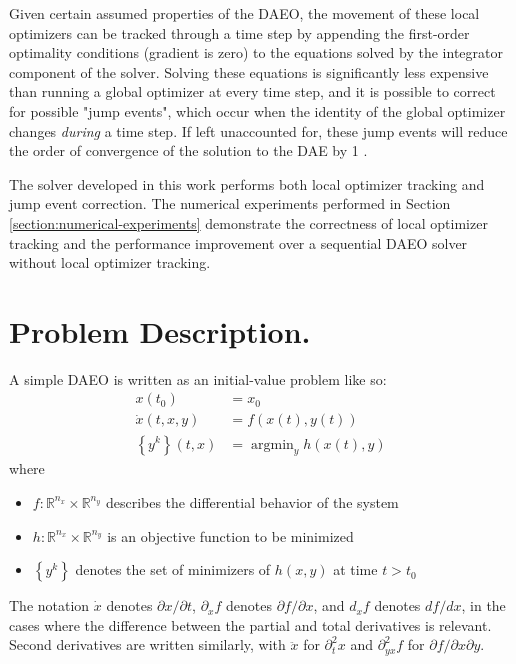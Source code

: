 \documentclass[twoside,leqno, twocolumn]{article}
\DeclareMathOperator*{\argmin}{\arg\min}
\newcommand{\bbR}{\ensuremath{\mathbb{R}}}
\begin{document}
Given certain assumed properties of the DAEO, the movement of these local optimizers can be tracked through a time step by appending the first-order optimality conditions (gradient is zero) to the equations solved by the integrator component of the solver. Solving these equations is significantly less expensive than running a global optimizer at every time step, and it is possible to correct for possible "jump events", which occur when the identity of the global optimizer changes \textit{during} a time step. If left unaccounted for, these jump events will reduce the order of convergence of the solution to the DAE by 1 \cite{deussenNumericalSimulationDifferentialalgebraic2023, mannshardtOnestepMethodsAny1978}.

The solver developed in this work performs both local optimizer tracking and jump event correction. The numerical experiments performed in Section \ref{section:numerical-experiments} demonstrate the correctness of local optimizer tracking and the performance improvement over a sequential DAEO solver without local optimizer tracking.

\section{Problem Description.}
A simple DAEO is written as an initial-value problem like so:
\begin{equation} \label{eq:daeo-ivp}
\begin{aligned}
	x(t_0) &= x_0\\
	\dot{x}(t, x, y) &= f(x(t), y(t))\\
	\left\{y^k\right\}(t, x) &= \argmin_{y}h(x(t), y)
\end{aligned}
\end{equation}
where 
\begin{itemize}
	\item $f:\bbR^{n_x}\times\bbR^{n_y}$ describes the differential behavior of the system
	\item $h:\bbR^{n_x}\times\bbR^{n_y}$ is an objective function to be minimized
	\item $\left\{y^k\right\}$ denotes the set of minimizers of $h(x, y)$ at time $t>t_0$
\end{itemize}
The notation $\dot{x}$ denotes $\partial x/\partial t$, $\partial_x f$ denotes $\partial f/\partial x$, and $d_x f$ denotes $df/dx$, in the cases where the difference between the partial and total derivatives is relevant. Second derivatives are written similarly, with $\ddot{x}$ for $\partial^2_t x$ and $\partial^2_{yx} f$ for $\partial f/\partial x\partial y$.
\end{document}
